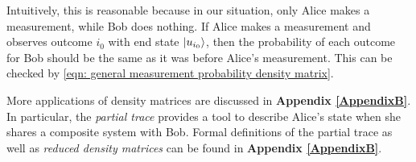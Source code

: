 Intuitively, this is reasonable because in our situation, only Alice makes a measurement, while Bob does nothing.  If Alice makes a measurement and observes outcome $i_0$ with end state $\ket{u_{i_0}}$, then the probability of each outcome for Bob should be the same as it was before Alice's measurement.  This can be checked by \eqref{eqn: general measurement probability density matrix}.

More applications of density matrices are discussed in \textbf{Appendix \ref{AppendixB}}.  In particular, the  \textit{partial trace} provides a tool to describe Alice's state when she shares a composite system with Bob.  Formal definitions of the partial trace as well as \textit{reduced density matrices} can be found in \textbf{Appendix \ref{AppendixB}}.




